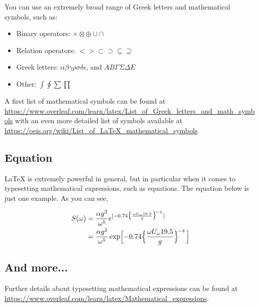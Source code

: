 \documentclass[11pt,twoside,openright]{report}
\begin{document}
You can use an extremely broad range of Greek letters and mathematical symbols, such as:
\begin{itemize}[nosep]
  \item Binary operators: $\times \otimes \oplus \cup \cap$ 
  \item Relation operators: $< > \subset \supset \subseteq \supseteq$
  \item Greek letters: $\alpha \beta \gamma \rho \sigma \delta \epsilon$, and $A B \Gamma \Sigma \Delta E$
  \item Other: $\int \oint \sum \prod$
\end{itemize}
%
A first list of mathematical symbols can be found at \url{https://www.overleaf.com/learn/latex/List_of_Greek_letters_and_math_symbols} with an even more detailed list of symbols available at  \url{https://oeis.org/wiki/List_of_LaTeX_mathematical_symbols} 


\subsection{Equation}
\label{sec:MathEquations}

\LaTeX{} is extremely powerful in general, but in particular when it comes to typesetting mathematical expressions, such as equations. 
The equation below is just one example. 
As you can see, 

\begin{align}\label{eq:MyEquation}
\begin{split}
S(\omega) 
&= \frac{\alpha g^2}{\omega^5} e^{[ -0.74\bigl\{\frac{\omega U_\omega 19.5}{g}\bigr\}^{\!-4}\,]} \\
&= \frac{\alpha g^2}{\omega^5} \exp\Bigl[ -0.74\Bigl\{\frac{\omega U_\omega 19.5}{g}\Bigr\}^{\!-4}\,\Bigr] 
\end{split}
\end{align}


\subsection{And more...}
\label{sec:MathMore}

Further details about typesetting mathematical expressions can be found at \url{https://www.overleaf.com/learn/latex/Mathematical_expressions}.




\end{document}
